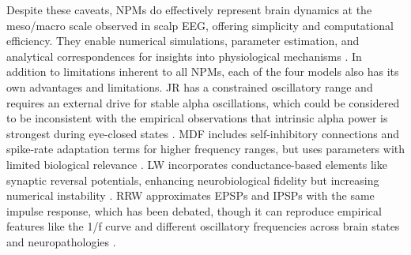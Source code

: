 \documentclass[12pt,twoside]{article}
\begin{document}
Despite these caveats, NPMs do effectively represent brain dynamics at the meso/macro scale observed in scalp EEG, offering simplicity and computational efficiency. They enable numerical simulations, parameter estimation, and analytical correspondences for insights into physiological mechanisms \citep{david2006mechanisms, abeysuriya2014prediction, momi2023tms}. In addition to limitations inherent to all NPMs, each of the four models also has its own advantages and limitations. JR has a constrained oscillatory range and requires an external drive for stable alpha oscillations, which could be considered to be inconsistent with the empirical observations that intrinsic alpha power is strongest during eye-closed states \citep{kiani2021realistic}. MDF includes self-inhibitory connections and spike-rate adaptation terms for higher frequency ranges, but uses parameters with limited biological relevance \citep{moran2007neural}. LW incorporates conductance-based elements like synaptic reversal potentials, enhancing neurobiological fidelity but increasing numerical instability \citep{liley2001spatially}. RRW approximates EPSPs and IPSPs with the same impulse response, which has been debated, though it can reproduce empirical features like the 1/f curve and different oscillatory frequencies across brain states and neuropathologies \citep{roberts2008modeling, zhao2015generalized, muller2017unified}.

\end{document}
